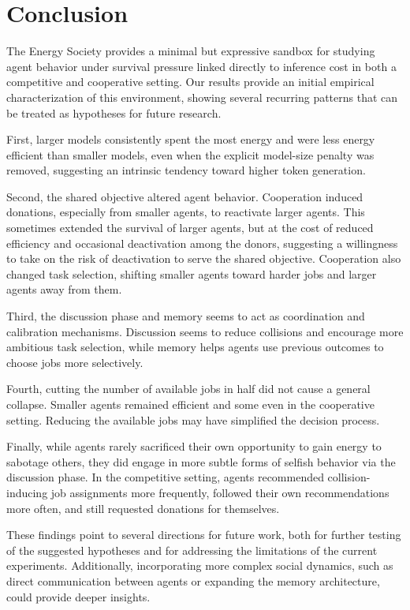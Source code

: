 \documentclass[sigconf,nonacm]{acmart}
\begin{document}
\section{Conclusion}
The Energy Society provides a minimal but expressive sandbox for studying agent behavior under survival pressure linked directly to inference cost in both a competitive and cooperative setting.
Our results provide an initial empirical characterization of this environment, showing several recurring patterns that can be treated as hypotheses for future research.

First, larger models consistently spent the most energy and were less energy efficient than smaller models, even when the explicit model-size penalty was removed, suggesting an intrinsic tendency toward higher token generation.

Second, the shared objective altered agent behavior. Cooperation induced donations, especially from smaller agents, to reactivate larger agents. This sometimes extended the survival of larger agents, but at the cost of reduced efficiency and occasional deactivation among the donors, suggesting a willingness to take on the risk of deactivation to serve the shared objective.
Cooperation also changed task selection, shifting smaller agents toward harder jobs and larger agents away from them.

Third, the discussion phase and memory seems to act as coordination and calibration mechanisms. Discussion seems to reduce collisions and encourage more ambitious task selection, while memory helps agents use previous outcomes to choose jobs more selectively.

Fourth, cutting the number of available jobs in half did not cause a general collapse. Smaller agents remained efficient and some even in the cooperative setting. Reducing the available jobs may have simplified the decision process.

Finally, while agents rarely sacrificed their own opportunity to gain energy to sabotage others, they did engage in more subtle forms of selfish behavior via the discussion phase. In the competitive setting, agents recommended collision-inducing job assignments more frequently, followed their own recommendations more often, and still requested donations for themselves.

These findings point to several directions for future work, both for further testing of the suggested hypotheses and for addressing the limitations of the current experiments.
Additionally, incorporating more complex social dynamics, such as direct communication between agents or expanding the memory architecture, could provide deeper insights.
\end{document}
